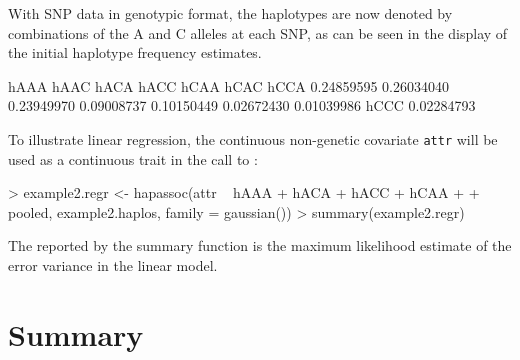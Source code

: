 \documentclass[article, shortnames]{jss}
\begin{document}
With SNP data in genotypic format, the haplotypes are now denoted by 
combinations of the A and C alleles at each SNP, as can be seen 
in the display of the initial haplotype frequency estimates.
\begin{Schunk}
\begin{Soutput}
      hAAA       hAAC       hACA       hACC       hCAA       hCAC       hCCA 
0.24859595 0.26034040 0.23949970 0.09008737 0.10150449 0.02672430 0.01039986 
      hCCC 
0.02284793 
\end{Soutput}
\end{Schunk}

To illustrate linear regression, the continuous non-genetic covariate 
{\tt attr} will be used as a continuous trait in the call to :

\begin{Schunk}
\begin{Sinput}
> example2.regr <- hapassoc(attr ~ hAAA + hACA + hACC + hCAA + 
+     pooled, example2.haplos, family = gaussian())
> summary(example2.regr)
\end{Sinput}
\end{Schunk}
The  reported by the summary function
is the maximum likelihood estimate of the error variance in the linear
model.

\section{Summary}
\end{document}

